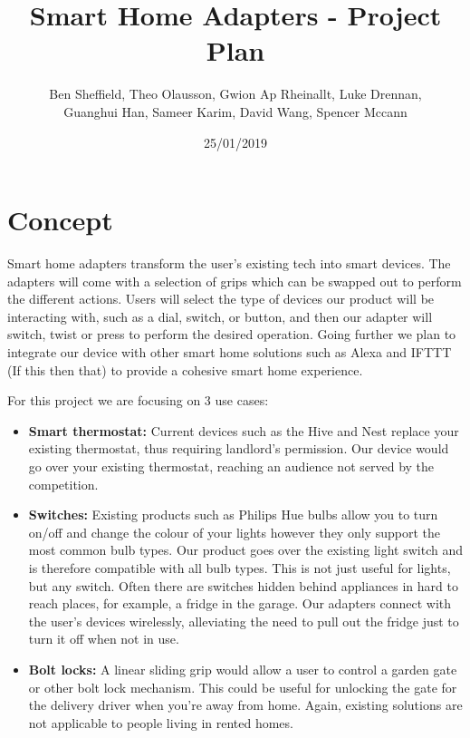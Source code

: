 \documentclass[onecolumn]{IEEEtran}
\begin{document}
\title{Smart Home Adapters - Project Plan}
\author{Ben Sheffield, Theo Olausson, Gwion Ap Rheinallt, Luke Drennan, \\Guanghui Han, Sameer Karim, David Wang, Spencer Mccann}
\date{25/01/2019} %

\maketitle

\section{Concept}
Smart home adapters transform the user’s existing tech into smart devices. The adapters will come with a selection of grips which can be swapped out to perform the different actions. Users will select the type of devices our product will be interacting with, such as a dial, switch, or button, and then our adapter will switch, twist or press to perform the desired operation. Going further we plan to integrate our device with other smart home solutions such as Alexa and IFTTT (If this then that) to provide a cohesive smart home experience.

For this project we are focusing on 3 use cases:

\begin{itemize}
    \item \textbf{Smart thermostat:} Current devices such as the Hive and Nest replace your existing thermostat, thus requiring landlord’s permission. Our device would go over your existing thermostat, reaching an audience not served by the competition.
    \item \textbf{Switches:} Existing products such as Philips Hue bulbs allow you to turn on/off and change the colour of your lights however they only support the most common bulb types. Our product goes over the existing light switch and is therefore compatible with all bulb types. This is not just useful for lights, but any switch. Often there are switches hidden behind appliances in hard to reach places, for example, a fridge in the garage. Our adapters connect with the user’s devices wirelessly, alleviating the need to pull out the fridge just to turn it off when not in use.
    \item \textbf{Bolt locks:} A linear sliding grip would allow a user to control a garden gate or other bolt lock mechanism. This could be useful for unlocking the gate for the delivery driver when you’re away from home. Again, existing solutions are not applicable to people living in rented homes.
\end{itemize}
\end{document}
